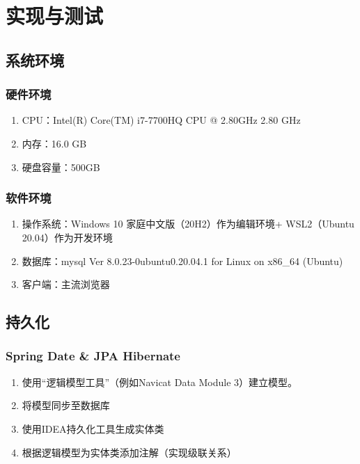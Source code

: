 
\chapter{实现与测试}
\label{实现与测试}

\section{系统环境}

\subsection{硬件环境}

\begin{enumerate}
  \item CPU：Intel(R) Core(TM) i7-7700HQ CPU @ 2.80GHz   2.80 GHz
  \item 内存：16.0 GB
  \item 硬盘容量：500GB
\end{enumerate}

\subsection{软件环境}

\begin{enumerate}
  \item 操作系统：Windows 10 家庭中文版（20H2）作为编辑环境+ WSL2（Ubuntu 20.04）作为开发环境
  \item 数据库：mysql Ver 8.0.23-0ubuntu0.20.04.1 for Linux on x86\_64 (Ubuntu)
  \item 客户端：主流浏览器
\end{enumerate}


\section{持久化}
\subsection{Spring Date \& JPA Hibernate}

\begin{enumerate}
  \item 使用“逻辑模型工具”（例如Navicat Data Module 3）建立模型。
  \item 将模型同步至数据库
  \item 使用IDEA持久化工具生成实体类
  \item 根据逻辑模型为实体类添加注解（实现级联关系）
\end{enumerate}

